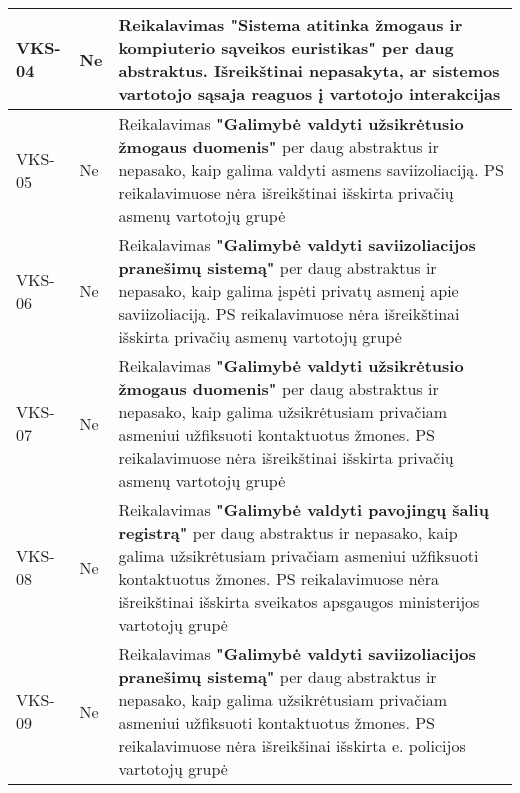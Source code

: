 \documentclass{VUMIFPSkursinis}
\begin{document}
\begin{center}
\begin{longtable}{|C{2cm}|L{2.5cm}|L{10cm}|}
		VKS-04                                          &
		Ne                                              &
		Reikalavimas \textbf{"Sistema atitinka žmogaus ir kompiuterio sąveikos euristikas"} per daug abstraktus. Išreikštinai nepasakyta, ar sistemos vartotojo sąsaja reaguos į vartotojo interakcijas                                                                               \\ \hline
		VKS-05                                          &
		Ne                                              &
		Reikalavimas \textbf{"Galimybė valdyti užsikrėtusio žmogaus duomenis"} per daug abstraktus ir nepasako, kaip galima valdyti asmens saviizoliaciją. PS reikalavimuose nėra išreikštinai išskirta privačių asmenų vartotojų grupė                                               \\ \hline
		VKS-06                                          &
		Ne                                              &
		Reikalavimas \textbf{"Galimybė valdyti saviizoliacijos pranešimų sistemą"} per daug abstraktus ir nepasako, kaip galima įspėti privatų asmenį apie saviizoliaciją. PS reikalavimuose nėra išreikštinai išskirta privačių asmenų vartotojų grupė                               \\ \hline
		VKS-07                                          &
		Ne                                              &
		Reikalavimas \textbf{"Galimybė valdyti užsikrėtusio žmogaus duomenis"} per daug abstraktus ir nepasako, kaip galima užsikrėtusiam privačiam asmeniui užfiksuoti kontaktuotus žmones. PS reikalavimuose nėra išreikštinai išskirta privačių asmenų vartotojų grupė             \\ \hline
		VKS-08                                          &
		Ne                                              &
		Reikalavimas \textbf{"Galimybė valdyti pavojingų šalių registrą"} per daug abstraktus ir nepasako, kaip galima užsikrėtusiam privačiam asmeniui užfiksuoti kontaktuotus žmones. PS reikalavimuose nėra išreikštinai išskirta sveikatos apsgaugos ministerijos vartotojų grupė \\ \hline
		VKS-09                                          &
		Ne                                              &
		Reikalavimas \textbf{"Galimybė valdyti saviizoliacijos pranešimų sistemą"} per daug abstraktus ir nepasako, kaip galima užsikrėtusiam privačiam asmeniui užfiksuoti kontaktuotus žmones. PS reikalavimuose nėra išreikšinai išskirta e. policijos vartotojų grupė             \\ \hline
	\end{longtable}
\end{center}
\end{document}
